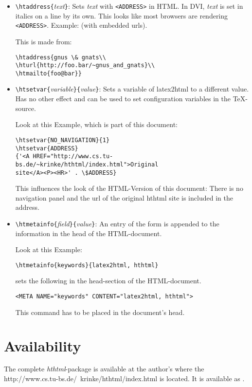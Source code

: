 \documentclass[11pt,a4paper]{article}
\begin{document}
\begin{itemize}
\item \verb|\htaddress{|\emph{text}\verb|}|:  Sets \emph{text} with
  \verb|<ADDRESS>| in HTML.  In DVI, \emph{text} is set in italics on
  a line by its own.  This looks like most browsers are rendering
  \verb|<ADDRESS>|. Example:  (with embedded urls).

This is made from:
\begin{verbatim}
\htaddress{gnus \& gnats\\
\hturl{http://foo.bar/~gnus_and_gnats}\\
\htmailto{foo@bar}}
\end{verbatim}

\item \verb|\htsetvar{|\emph{variable}\verb|}{|\emph{value}\verb|}|:
  Sets a variable of latex2html to a different value.  Has no other
  effect and can be used to set configuration variables in the
  \TeX-source.

Look at this Example, which is part of this document:
\begin{verbatim}
\htsetvar{NO_NAVIGATION}{1}
\htsetvar{ADDRESS}
{'<A HREF="http://www.cs.tu-bs.de/~krinke/hthtml/index.html">Original
site</A><P><HR>' . \$ADDRESS}
\end{verbatim}

This influences the look of the HTML-Version of this document:  There
is no navigation panel and the url of the original hthtml site is
included in the address.\par

\item \verb|\htmetainfo{|\emph{field}\verb|}{|\emph{value}\verb|}|:
  An entry of the form \verb|| is appended to the information in the
  head of the HTML-document.


Look at this Example:
\begin{verbatim}
\htmetainfo{keywords}{latex2html, hthtml}
\end{verbatim}

    sets the following in the head-section of the HTML-document.
\begin{verbatim}
<META NAME="keywords" CONTENT="latex2html, hthtml">
\end{verbatim}

    This command has to be placed in the document's head.
\end{itemize}

\section{Availability}

The complete \emph{hthtml}-package is available at the author's
 where the
{http://www.cs.tu-bs.de/~krinke/hthtml/index.html} is located.  It is
available as .
\end{document}
